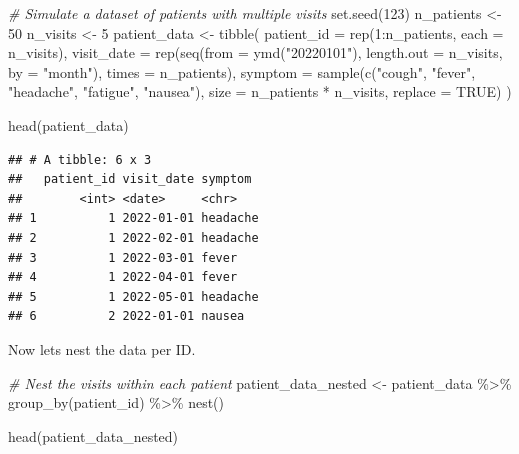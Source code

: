 \documentclass[
]{book}
\newenvironment{Shaded}{\begin{snugshade}}{\end{snugshade}}
\newcommand{\AttributeTok}[1]{\textcolor[rgb]{0.77,0.63,0.00}{#1}}
\newcommand{\CommentTok}[1]{\textcolor[rgb]{0.56,0.35,0.01}{\textit{#1}}}
\newcommand{\ConstantTok}[1]{\textcolor[rgb]{0.00,0.00,0.00}{#1}}
\newcommand{\DecValTok}[1]{\textcolor[rgb]{0.00,0.00,0.81}{#1}}
\newcommand{\FunctionTok}[1]{\textcolor[rgb]{0.00,0.00,0.00}{#1}}
\newcommand{\NormalTok}[1]{#1}
\newcommand{\OtherTok}[1]{\textcolor[rgb]{0.56,0.35,0.01}{#1}}
\newcommand{\SpecialCharTok}[1]{\textcolor[rgb]{0.00,0.00,0.00}{#1}}
\newcommand{\StringTok}[1]{\textcolor[rgb]{0.31,0.60,0.02}{#1}}
\begin{document}
\begin{Shaded}
\begin{Highlighting}[]
\CommentTok{\# Simulate a dataset of patients with multiple visits}
\FunctionTok{set.seed}\NormalTok{(}\DecValTok{123}\NormalTok{)}
\NormalTok{n\_patients }\OtherTok{\textless{}{-}} \DecValTok{50}
\NormalTok{n\_visits }\OtherTok{\textless{}{-}} \DecValTok{5}
\NormalTok{patient\_data }\OtherTok{\textless{}{-}} \FunctionTok{tibble}\NormalTok{(}
  \AttributeTok{patient\_id =} \FunctionTok{rep}\NormalTok{(}\DecValTok{1}\SpecialCharTok{:}\NormalTok{n\_patients, }\AttributeTok{each =}\NormalTok{ n\_visits),}
  \AttributeTok{visit\_date =} \FunctionTok{rep}\NormalTok{(}\FunctionTok{seq}\NormalTok{(}\AttributeTok{from =} \FunctionTok{ymd}\NormalTok{(}\StringTok{"20220101"}\NormalTok{), }\AttributeTok{length.out =}\NormalTok{ n\_visits, }\AttributeTok{by =} \StringTok{"month"}\NormalTok{), }\AttributeTok{times =}\NormalTok{ n\_patients),}
  \AttributeTok{symptom =} \FunctionTok{sample}\NormalTok{(}\FunctionTok{c}\NormalTok{(}\StringTok{"cough"}\NormalTok{, }\StringTok{"fever"}\NormalTok{, }\StringTok{"headache"}\NormalTok{, }\StringTok{"fatigue"}\NormalTok{, }\StringTok{"nausea"}\NormalTok{), }\AttributeTok{size =}\NormalTok{ n\_patients }\SpecialCharTok{*}\NormalTok{ n\_visits, }\AttributeTok{replace =} \ConstantTok{TRUE}\NormalTok{)}
\NormalTok{)}

\FunctionTok{head}\NormalTok{(patient\_data)}
\end{Highlighting}
\end{Shaded}

\begin{verbatim}
## # A tibble: 6 x 3
##   patient_id visit_date symptom 
##        <int> <date>     <chr>   
## 1          1 2022-01-01 headache
## 2          1 2022-02-01 headache
## 3          1 2022-03-01 fever   
## 4          1 2022-04-01 fever   
## 5          1 2022-05-01 headache
## 6          2 2022-01-01 nausea
\end{verbatim}

Now lets nest the data per ID.

\begin{Shaded}
\begin{Highlighting}[]
\CommentTok{\# Nest the visits within each patient}
\NormalTok{patient\_data\_nested }\OtherTok{\textless{}{-}}\NormalTok{ patient\_data }\SpecialCharTok{\%\textgreater{}\%} 
  \FunctionTok{group\_by}\NormalTok{(patient\_id) }\SpecialCharTok{\%\textgreater{}\%} 
  \FunctionTok{nest}\NormalTok{()}

\FunctionTok{head}\NormalTok{(patient\_data\_nested)}
\end{Highlighting}
\end{Shaded}
\end{document}
